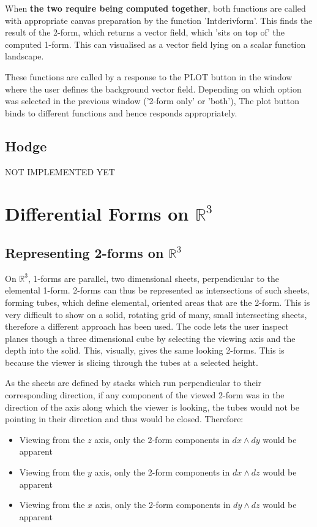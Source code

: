 \documentclass[12pt]{report}
\begin{document}
When \textbf{the two require being computed together}, both functions are called with appropriate canvas preparation by the function 'Int\textunderscore deriv\textunderscore form'. This finds the result of the 2-form, which returns a vector field, which 'sits on top of' the computed 1-form. This can visualised as a vector field lying on a scalar function landscape.

\noindent These functions are called by a response to the PLOT button in the window where the user defines the background vector field. Depending on which option was selected in the previous window ('2-form only' or 'both'), The plot button binds to different functions and hence responds appropriately.

\section{Hodge}


NOT IMPLEMENTED YET



\chapter{Differential Forms on $\mathbb{R}^{3}$}
\section{Representing 2-forms on $\mathbb{R}^{3}$}
On $\mathbb{R}^{3}$, 1-forms are parallel, two dimensional sheets, perpendicular to the elemental 1-form. 2-forms can thus be represented as intersections of such sheets, forming tubes, which define elemental, oriented areas that are the 2-form. This is very difficult to show on a solid, rotating grid of many, small intersecting sheets, therefore a different approach has been used. The code lets the user inspect planes though a three dimensional cube by selecting the viewing axis and the depth into the solid.
This, visually, gives the same looking 2-forms. This is because the viewer is slicing through the tubes at a selected height.

As the sheets are defined by stacks which run perpendicular to their corresponding direction, if any component of the viewed 2-form was in the direction of the axis along which the viewer is looking, the tubes would not be pointing in their direction and thus would be closed. Therefore:
\begin{itemize}
	\item Viewing from the $z$ axis, only the 2-form components in $dx\wedge dy$ would be apparent
	\item Viewing from the $y$ axis, only the 2-form components in $dx\wedge dz$ would be apparent
	\item Viewing from the $x$ axis, only the 2-form components in $dy\wedge dz$ would be apparent
\end{itemize} 
\end{document}
